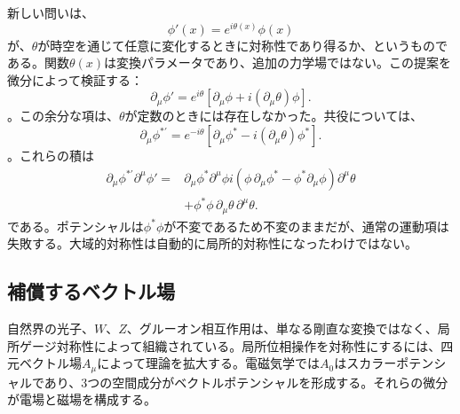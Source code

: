 新しい問いは、\begin{equation}
  \phi'(x)=e^{i\theta(x)}\phi(x)
  \label{eq:l07-local-u1}
\end{equation}が、\(\theta\)が時空を通じて任意に変化するときに対称性であり得るか、というものである。関数\(\theta(x)\)は変換パラメータであり、追加の力学場ではない。この提案を微分によって検証する：\begin{equation}
  \partial_\mu\phi'
  =e^{i\theta}
   \left[\partial_\mu\phi+i(\partial_\mu\theta)\phi\right].
  \label{eq:l07-local-derivative}
\end{equation}。この余分な項は、\(\theta\)が定数のときには存在しなかった。共役については、\begin{equation}
  \partial_\mu\phi^{*\prime}
  =e^{-i\theta}
   \left[\partial_\mu\phi^*-i(\partial_\mu\theta)\phi^*\right].
\end{equation}。これらの積は\begin{align}
  \partial_\mu\phi^{*\prime}\partial^\mu\phi'
  ={}&
  \partial_\mu\phi^*\partial^\mu\phi
  i\left(
      \phi\,\partial_\mu\phi^*
      -\phi^*\partial_\mu\phi
    \right)\partial^\mu\theta
  \nonumber\\
  &+\phi^*\phi\,
    \partial_\mu\theta\,\partial^\mu\theta.
  \label{eq:l07-local-failure}
\end{align}である。ポテンシャルは\(\phi^*\phi\)が不変であるため不変のままだが、通常の運動項は失敗する。大域的対称性は自動的に局所的対称性になったわけではない。

\begin{classroomqa}
\end{classroomqa}

\subsection{補償するベクトル場}

自然界の光子、\(W\)、\(Z\)、グルーオン相互作用は、単なる剛直な変換ではなく、局所ゲージ対称性によって組織されている。局所位相操作を対称性にするには、四元ベクトル場\(A_\mu\)によって理論を拡大する。電磁気学では\(A_0\)はスカラーポテンシャルであり、3つの空間成分がベクトルポテンシャルを形成する。それらの微分が電場と磁場を構成する。

